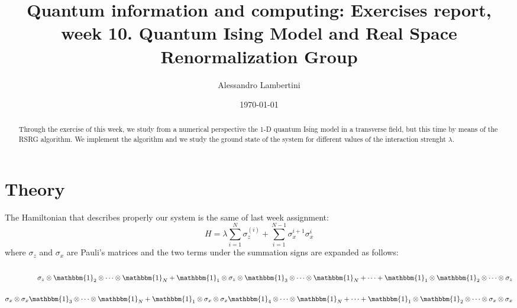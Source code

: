 \documentclass[prb,9pt,notitlepage]{revtex4-1}
\begin{document}
\title{Quantum information and computing: Exercises report, week 10. Quantum Ising Model and Real Space Renormalization Group }

\author{Alessandro Lambertini}


\date{\today}

\begin{abstract}
Through the exercise of this week,  we study from a numerical perspective the 1-D quantum Ising model in a transverse field, but this time by means of the RSRG algorithm. We implement the algorithm and we study the ground state of the system for different values of the interaction strenght $\lambda$.
\end{abstract}

\maketitle

\section{Theory}
The Hamiltonian that describes properly our system is the same of last week assignment:
\begin{equation}
  H = \lambda\sum_{i=1}^N \sigma_z^{(i)} + \sum_{i=1}^{N-1}\sigma_x^{i+1}\sigma_x^{i}
\end{equation}
where $\sigma_z$ and $\sigma_x$ are Pauli's matrices and the two terms under the summation signs are expanded as follows:
\begin{eqnarray}
\nonumber\\
\sigma_z \otimes \mathbbm{1}_2\otimes\dots\otimes\mathbbm{1}_N + \mathbbm{1}_1\otimes\sigma_z\otimes \mathbbm{1}_3\otimes\dots\otimes\mathbbm{1}_N+\dots+\mathbbm{1}_1\otimes\mathbbm{1}_2\otimes\dots\otimes\sigma_z \label{first_term}\\\nonumber
\\
\sigma_x \otimes \sigma_x\mathbbm{1}_3\otimes\dots\otimes\mathbbm{1}_N + \mathbbm{1}_1\otimes\sigma_x\otimes\sigma_x \mathbbm{1}_4\otimes\dots\otimes\mathbbm{1}_N+\dots+\mathbbm{1}_1\otimes\mathbbm{1}_2\otimes\dots\otimes\sigma_x\otimes\sigma_x \label{second_term} \\\nonumber
\end{eqnarray}
\end{document}
